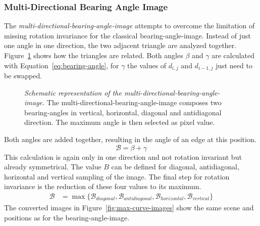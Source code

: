 \subsubsection{Multi-Directional Bearing Angle Image}

The \emph{\gls{multi-directional-bearing-angle-image}} attempts to overcome the limitation of missing rotation invariance for the classical \gls{bearing-angle-image}.
Instead of just one angle in one direction, the two adjacent triangle are analyzed together.
Figure~\ref{fig:max-curve} shows how the triangles are related.
Both angles $\beta$ and $\gamma$ are calculated with Equation~\ref{eq:bearing-angle}, for $\gamma$ the values of $d_{i,j}$ and $d_{i-1,j}$ just need to be swapped.
\begin{figure}
    \scalebox{0.9}{%
    
    }
    \caption[Schematic representation of the \gls{multi-directional-bearing-angle-image}]{\emph{Schematic representation of the \gls{multi-directional-bearing-angle-image}.} The \gls{multi-directional-bearing-angle-image} composes two \Glspl{bearing-angle} in vertical, horizontal, diagonal and antidiagonal direction. The maximum angle is then selected as pixel value.}\label{fig:max-curve}
\end{figure}
Both angles are added together, resulting in the angle of an edge at this position.
\begin{equation}
    \mathcal{B} = \beta + \gamma
\end{equation}
This calculation is again only in one direction and not rotation invariant but already symmetrical.
The value $B$ can be defined for diagonal, antidiagonal, horizontal and vertical sampling of the image.
The final step for rotation invariance is the reduction of these four values to its maximum.
\vspace{-2mm}
\begin{align}
    \mathcal{B} &= \max{\{\mathcal{B}_{diagonal}, \mathcal{B}_{antidiagonal}, \mathcal{B}_{horizontal}, \mathcal{B}_{vertical}\}}
\end{align}
The converted images in Figure~\ref{fig:max-curve-images} show the same scene and positions as for the \gls{bearing-angle-image}.
